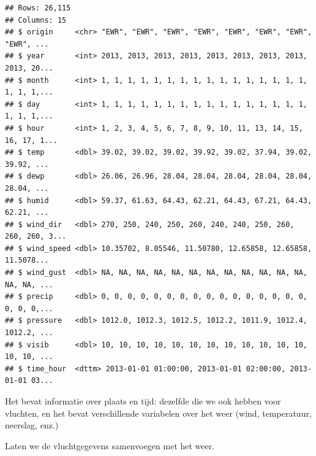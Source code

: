 \documentclass[]{tufte-book}
\newenvironment{Shaded}{}{}
\newcommand{\KeywordTok}[1]{\textcolor[rgb]{0.00,0.44,0.13}{\textbf{#1}}}
\newcommand{\NormalTok}[1]{#1}
\newcommand{\OperatorTok}[1]{\textcolor[rgb]{0.40,0.40,0.40}{#1}}
\newcommand{\StringTok}[1]{\textcolor[rgb]{0.25,0.44,0.63}{#1}}
\begin{document}
\begin{verbatim}
## Rows: 26,115
## Columns: 15
## $ origin     <chr> "EWR", "EWR", "EWR", "EWR", "EWR", "EWR", "EWR", "EWR", ...
## $ year       <int> 2013, 2013, 2013, 2013, 2013, 2013, 2013, 2013, 2013, 20...
## $ month      <int> 1, 1, 1, 1, 1, 1, 1, 1, 1, 1, 1, 1, 1, 1, 1, 1, 1, 1, 1,...
## $ day        <int> 1, 1, 1, 1, 1, 1, 1, 1, 1, 1, 1, 1, 1, 1, 1, 1, 1, 1, 1,...
## $ hour       <int> 1, 2, 3, 4, 5, 6, 7, 8, 9, 10, 11, 13, 14, 15, 16, 17, 1...
## $ temp       <dbl> 39.02, 39.02, 39.02, 39.92, 39.02, 37.94, 39.02, 39.92, ...
## $ dewp       <dbl> 26.06, 26.96, 28.04, 28.04, 28.04, 28.04, 28.04, 28.04, ...
## $ humid      <dbl> 59.37, 61.63, 64.43, 62.21, 64.43, 67.21, 64.43, 62.21, ...
## $ wind_dir   <dbl> 270, 250, 240, 250, 260, 240, 240, 250, 260, 260, 260, 3...
## $ wind_speed <dbl> 10.35702, 8.05546, 11.50780, 12.65858, 12.65858, 11.5078...
## $ wind_gust  <dbl> NA, NA, NA, NA, NA, NA, NA, NA, NA, NA, NA, NA, NA, NA, ...
## $ precip     <dbl> 0, 0, 0, 0, 0, 0, 0, 0, 0, 0, 0, 0, 0, 0, 0, 0, 0, 0, 0,...
## $ pressure   <dbl> 1012.0, 1012.3, 1012.5, 1012.2, 1011.9, 1012.4, 1012.2, ...
## $ visib      <dbl> 10, 10, 10, 10, 10, 10, 10, 10, 10, 10, 10, 10, 10, 10, ...
## $ time_hour  <dttm> 2013-01-01 01:00:00, 2013-01-01 02:00:00, 2013-01-01 03...
\end{verbatim}

Het bevat informatie over plaats en tijd: dezelfde die we ook hebben voor vluchten, en het bevat verschillende variabelen over het weer (wind, temperatuur, neerslag, enz.)

Laten we de vluchtgegevens samenvoegen met het weer.

\begin{Shaded}
\end{Shaded}
\end{document}
